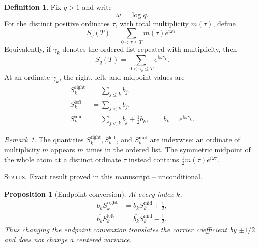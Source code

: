 \documentclass[11pt]{amsart}
\numberwithin{equation}{section}
\theoremstyle{plain}
\newtheorem{proposition}[theorem]{Proposition}
\theoremstyle{definition}
\newtheorem{definition}[theorem]{Definition}
\theoremstyle{remark}
\newtheorem{remark}[theorem]{Remark}
\newcommand{\1}{\mathbf{1}}
\newcommand{\statusnote}[1]{%
  \par\smallskip\noindent
  \begingroup\footnotesize\textsc{Status.} #1\endgroup
  \par\smallskip}
\begin{document}
\begin{definition}
\label{def:phase_walk_q}
Fix \(q>1\) and write
\begin{equation}
\omega=\log q.
\label{eq:omega_definition}
\end{equation}
For the distinct positive ordinates \(\tau\), with total
multiplicity \(m(\tau)\), define
\begin{equation}
S_q(T)
=
\sum_{0<\tau\leq T}m(\tau)e^{i\omega\tau}.
\label{eq:Sq_definition}
\end{equation}
Equivalently, if \(\gamma_k\) denotes the ordered list repeated with
multiplicity, then
\begin{equation}
S_q(T)=\sum_{0<\gamma_k\leq T}e^{i\omega\gamma_k}.
\label{eq:Sq_indexed_equivalent}
\end{equation}
At an ordinate \(\gamma_k\), the right, left, and midpoint values are
\begin{align}
S_k^{\mathrm{right}}
&=
\sum_{j\leq k}b_j,
\label{eq:right_sum}
\\
S_k^{\mathrm{left}}
&=
\sum_{j<k}b_j,
\label{eq:left_sum}
\\
S_k^{\mathrm{mid}}
&=
\sum_{j<k}b_j+\frac12b_k,
\qquad
b_k=e^{i\omega\gamma_k}.
\label{eq:mid_sum}
\end{align}
\end{definition}

\begin{remark}
\label{rem:indexwise_vs_atomic_midpoint}
The quantities \(S_k^{\mathrm{right}},S_k^{\mathrm{left}}\), and
\(S_k^{\mathrm{mid}}\) are indexwise: an ordinate of multiplicity \(m\)
appears \(m\) times in the ordered list.  The symmetric midpoint of the
whole atom at a distinct ordinate \(\tau\) instead contains
\(\frac12m(\tau)e^{i\omega\tau}\).
\end{remark}

\statusnote{Exact result proved in this manuscript -- unconditional.}
\begin{proposition}[Endpoint conversion]
\label{prop:endpoint_conversion}
At every index \(k\),
\begin{align}
\overline{b_k}S_k^{\mathrm{right}}
&=
\overline{b_k}S_k^{\mathrm{mid}}+\frac12,
\label{eq:right_mid_conversion}
\\
\overline{b_k}S_k^{\mathrm{left}}
&=
\overline{b_k}S_k^{\mathrm{mid}}-\frac12.
\label{eq:left_mid_conversion}
\end{align}
Thus changing the endpoint convention translates the carrier coefficient
by \(\pm1/2\) and does not change a centered variance.
\end{proposition}
\end{document}
